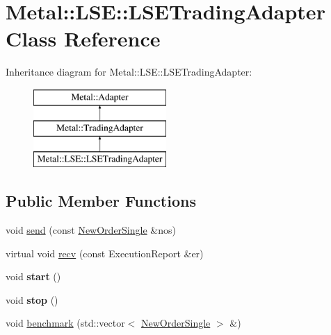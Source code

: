\hypertarget{classMetal_1_1LSE_1_1LSETradingAdapter}{}\section{Metal\+:\+:L\+S\+E\+:\+:L\+S\+E\+Trading\+Adapter Class Reference}
\label{classMetal_1_1LSE_1_1LSETradingAdapter}
Inheritance diagram for Metal\+:\+:L\+S\+E\+:\+:L\+S\+E\+Trading\+Adapter\+:\begin{figure}[H]
\begin{center}
\leavevmode
\includegraphics[height=3.000000cm]{classMetal_1_1LSE_1_1LSETradingAdapter}
\end{center}
\end{figure}
\subsection*{Public Member Functions}
\begin{DoxyCompactItemize}
\item 
void \hyperlink{classMetal_1_1LSE_1_1LSETradingAdapter_a1fa8ed02f7019bdef5d4b06f4d9b1880}{send} (const \hyperlink{classMetal_1_1NewOrderSingle}{New\+Order\+Single} \&nos)
\item 
virtual void \hyperlink{classMetal_1_1LSE_1_1LSETradingAdapter_a3b369e3202f0e18d04cd13dae6b83fd6}{recv} (const Execution\+Report \&er)
\item 
\hypertarget{classMetal_1_1LSE_1_1LSETradingAdapter_add687c5013bdab761a12409a1df1c5ab}{}void {\bfseries start} ()\label{classMetal_1_1LSE_1_1LSETradingAdapter_add687c5013bdab761a12409a1df1c5ab}

\item 
\hypertarget{classMetal_1_1LSE_1_1LSETradingAdapter_a608f5b9099d0c205c7ddbb588944fadb}{}void {\bfseries stop} ()\label{classMetal_1_1LSE_1_1LSETradingAdapter_a608f5b9099d0c205c7ddbb588944fadb}

\item 
void \hyperlink{classMetal_1_1LSE_1_1LSETradingAdapter_a3b68993cc83c390be7dcfa2fecd22d10}{benchmark} (std\+::vector$<$ \hyperlink{classMetal_1_1NewOrderSingle}{New\+Order\+Single} $>$ \&)
\end{DoxyCompactItemize}
